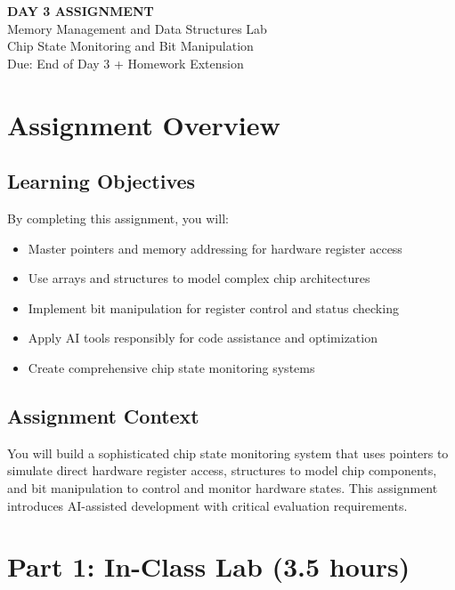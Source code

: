 \documentclass[11pt,a4paper]{article}
\begin{document}
\begin{center}
    {\Huge\bfseries\color{codeblue} DAY 3 ASSIGNMENT}\\[0.5cm]
    {\Large Memory Management and Data Structures Lab}\\[0.3cm]
    {\large Chip State Monitoring and Bit Manipulation}\\[0.2cm]
    {\normalsize Due: End of Day 3 + Homework Extension}
\end{center}

\vspace{1cm}

\section{Assignment Overview}

\subsection{Learning Objectives}
By completing this assignment, you will:
\begin{itemize}
    \item Master pointers and memory addressing for hardware register access
    \item Use arrays and structures to model complex chip architectures
    \item Implement bit manipulation for register control and status checking
    \item Apply AI tools responsibly for code assistance and optimization
    \item Create comprehensive chip state monitoring systems
\end{itemize}

\subsection{Assignment Context}
You will build a sophisticated chip state monitoring system that uses pointers to simulate direct hardware register access, structures to model chip components, and bit manipulation to control and monitor hardware states. This assignment introduces AI-assisted development with critical evaluation requirements.

\section{Part 1: In-Class Lab (3.5 hours)}
\end{document}
